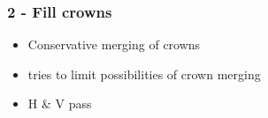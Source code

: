 \documentclass[aspectratio=169]{beamer}
\begin{document}


{
\begin{frame}[plain]
\end{frame}}


\begin{frame}
  \frametitle{2 - Fill crowns}
\begin{center}
\begin{itemize}
 \item Conservative merging of crowns
 \item tries to limit possibilities of crown merging
 \item H \& V pass
\end{itemize}
\end{center}
\end{frame}

\end{document}
